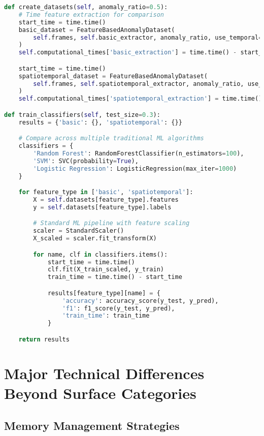 \documentclass[11pt,a4paper]{article}
\begin{document}
\begin{lstlisting}[language=Python, caption=Feature-Based Evaluation]
def create_datasets(self, anomaly_ratio=0.5):
    # Time feature extraction for comparison
    start_time = time.time()
    basic_dataset = FeatureBasedAnomalyDataset(
        self.frames, self.basic_extractor, anomaly_ratio, use_temporal=False
    )
    self.computational_times['basic_extraction'] = time.time() - start_time

    start_time = time.time()
    spatiotemporal_dataset = FeatureBasedAnomalyDataset(
        self.frames, self.spatiotemporal_extractor, anomaly_ratio, use_temporal=True
    )
    self.computational_times['spatiotemporal_extraction'] = time.time() - start_time

def train_classifiers(self, test_size=0.3):
    results = {'basic': {}, 'spatiotemporal': {}}

    # Compare across multiple traditional ML algorithms
    classifiers = {
        'Random Forest': RandomForestClassifier(n_estimators=100),
        'SVM': SVC(probability=True),
        'Logistic Regression': LogisticRegression(max_iter=1000)
    }

    for feature_type in ['basic', 'spatiotemporal']:
        X = self.datasets[feature_type].features
        y = self.datasets[feature_type].labels

        # Standard ML pipeline with feature scaling
        scaler = StandardScaler()
        X_scaled = scaler.fit_transform(X)

        for name, clf in classifiers.items():
            start_time = time.time()
            clf.fit(X_train_scaled, y_train)
            train_time = time.time() - start_time

            results[feature_type][name] = {
                'accuracy': accuracy_score(y_test, y_pred),
                'f1': f1_score(y_test, y_pred),
                'train_time': train_time
            }

    return results
\end{lstlisting}

\section{Major Technical Differences Beyond Surface Categories}

\subsection{Memory Management Strategies}
\end{document}
